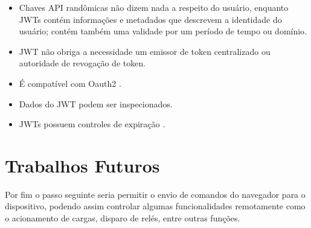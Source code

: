 \begin{itemize}
\itemsep1pt\parskip0pt
\item
  Chaves API randômicas não dizem nada a respeito do usuário, enquanto
  JWTs contém informações e metadados que descrevem a identidade do
  usuário; contém também uma validade por um período de tempo ou
  domínio.
\item
  JWT não obriga a necessidade um emissor de token centralizado ou
  autoridade de revogação de token.
\item
  É compatível com Oauth2 \cite{oauth2:2012}.
\item
  Dados do JWT podem ser inspecionados.
\item
  JWTs possuem controles de expiração \cite{romero:2015}.
\end{itemize}

\section{Trabalhos Futuros}\label{trabalhos-futuros}

Por fim o passo seguinte seria permitir o envio de comandos do navegador
para o dispositivo, podendo assim controlar algumas funcionalidades
remotamente como o acionamento de cargas, disparo de relés, entre outras
funções.
